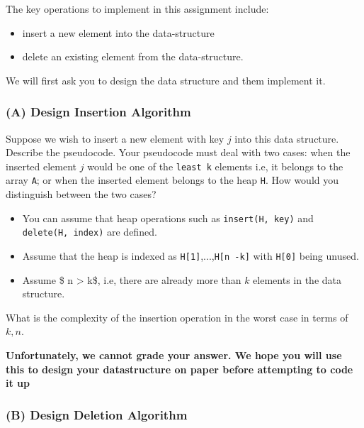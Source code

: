 \documentclass[
]{article}
\providecommand{\tightlist}{%
  \setlength{\itemsep}{0pt}\setlength{\parskip}{0pt}}
\begin{document}
The key operations to implement in this assignment include:

\begin{itemize}
\tightlist
\item
  insert a new element into the data-structure
\item
  delete an existing element from the data-structure.
\end{itemize}

We will first ask you to design the data structure and them implement
it.

\hypertarget{a-design-insertion-algorithm}{%
\subsubsection{(A) Design Insertion
Algorithm}\label{a-design-insertion-algorithm}}

Suppose we wish to insert a new element with key \(j\) into this data
structure. Describe the pseudocode. Your pseudocode must deal with two
cases: when the inserted element \(j\) would be one of the
\texttt{least\ k} elements i.e, it belongs to the array \texttt{A}; or
when the inserted element belongs to the heap \texttt{H}. How would you
distinguish between the two cases?

\begin{itemize}
\tightlist
\item
  You can assume that heap operations such as \texttt{insert(H,\ key)}
  and \texttt{delete(H,\ index)} are defined.
\item
  Assume that the heap is indexed as
  \texttt{H{[}1{]}},...,\texttt{H{[}n\ -k{]}} with \texttt{H{[}0{]}}
  being unused.
\item
  Assume \$ n \textgreater{} k\$, i.e, there are already more than \(k\)
  elements in the data structure.
\end{itemize}

What is the complexity of the insertion operation in the worst case in
terms of \(k, n\).

\textbf{Unfortunately, we cannot grade your answer. We hope you will use
this to design your datastructure on paper before attempting to code it
up}

\hypertarget{b-design-deletion-algorithm}{%
\subsubsection{(B) Design Deletion
Algorithm}\label{b-design-deletion-algorithm}}
\end{document}

